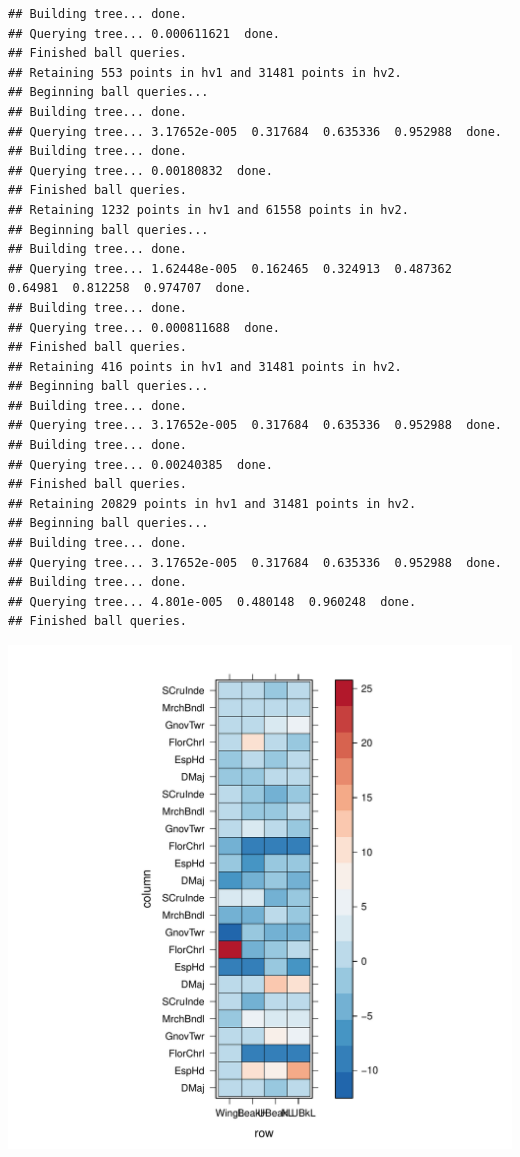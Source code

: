 \documentclass[12pt]{article}\usepackage[]{graphicx}\usepackage[]{color}
\makeatletter
\def\maxwidth{ %
  \ifdim\Gin@nat@width>\linewidth
    \linewidth
  \else
    \Gin@nat@width
  \fi
}
\newenvironment{kframe}{%
 \def\at@end@of@kframe{}%
 \ifinner\ifhmode%
  \def\at@end@of@kframe{\end{minipage}}%
  \begin{minipage}{\columnwidth}%
 \fi\fi%
 \def\FrameCommand##1{\hskip\@totalleftmargin \hskip-\fboxsep
 \colorbox{shadecolor}{##1}\hskip-\fboxsep
     \hskip-\linewidth \hskip-\@totalleftmargin \hskip\columnwidth}%
 \MakeFramed {\advance\hsize-\width
   \@totalleftmargin\z@ \linewidth\hsize
   \@setminipage}}%
 {\par\unskip\endMakeFramed%
 \at@end@of@kframe}
\newenvironment{knitrout}{}{} %
\makeatother
\begin{document}
\begin{knitrout}
\begin{kframe}
\begin{verbatim}
## Building tree... done.
## Querying tree... 0.000611621  done.
## Finished ball queries. 
## Retaining 553 points in hv1 and 31481 points in hv2.
## Beginning ball queries... 
## Building tree... done.
## Querying tree... 3.17652e-005  0.317684  0.635336  0.952988  done.
## Building tree... done.
## Querying tree... 0.00180832  done.
## Finished ball queries. 
## Retaining 1232 points in hv1 and 61558 points in hv2.
## Beginning ball queries... 
## Building tree... done.
## Querying tree... 1.62448e-005  0.162465  0.324913  0.487362  0.64981  0.812258  0.974707  done.
## Building tree... done.
## Querying tree... 0.000811688  done.
## Finished ball queries. 
## Retaining 416 points in hv1 and 31481 points in hv2.
## Beginning ball queries... 
## Building tree... done.
## Querying tree... 3.17652e-005  0.317684  0.635336  0.952988  done.
## Building tree... done.
## Querying tree... 0.00240385  done.
## Finished ball queries. 
## Retaining 20829 points in hv1 and 31481 points in hv2.
## Beginning ball queries... 
## Building tree... done.
## Querying tree... 3.17652e-005  0.317684  0.635336  0.952988  done.
## Building tree... done.
## Querying tree... 4.801e-005  0.480148  0.960248  done.
## Finished ball queries.
\end{verbatim}
\end{kframe}
\includegraphics[width=\maxwidth]{figure/unnamed-chunk-571} 


\end{knitrout}
\end{document}
